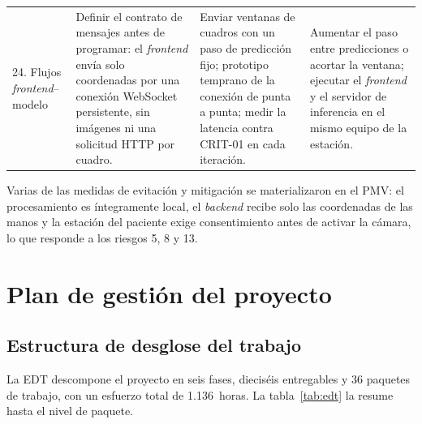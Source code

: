 {\begin{longtable}{@{}p{1.5cm}p{3.5cm}p{5.0cm}p{4.9cm}@{}}
24. Flujos \emph{frontend}--modelo & Definir el contrato de mensajes antes de programar: el \emph{frontend} envía solo coordenadas por una conexión WebSocket persistente, sin imágenes ni una solicitud HTTP por cuadro. & Enviar ventanas de cuadros con un paso de predicción fijo; prototipo temprano de la conexión de punta a punta; medir la latencia contra CRIT-01 en cada iteración. & Aumentar el paso entre predicciones o acortar la ventana; ejecutar el \emph{frontend} y el servidor de inferencia en el mismo equipo de la estación. \\
\end{longtable}
}

Varias de las medidas de evitación y mitigación se materializaron en el PMV: el procesamiento es íntegramente local, el \emph{backend} recibe solo las coordenadas de las manos y la estación del paciente exige consentimiento antes de activar la cámara, lo que responde a los riesgos 5, 8 y 13.

\section{Plan de gestión del proyecto}

\subsection{Estructura de desglose del trabajo}

La EDT descompone el proyecto en seis fases, dieciséis entregables y 36 paquetes de trabajo, con un esfuerzo total de 1.136~horas. La tabla~\ref{tab:edt} la resume hasta el nivel de paquete.

